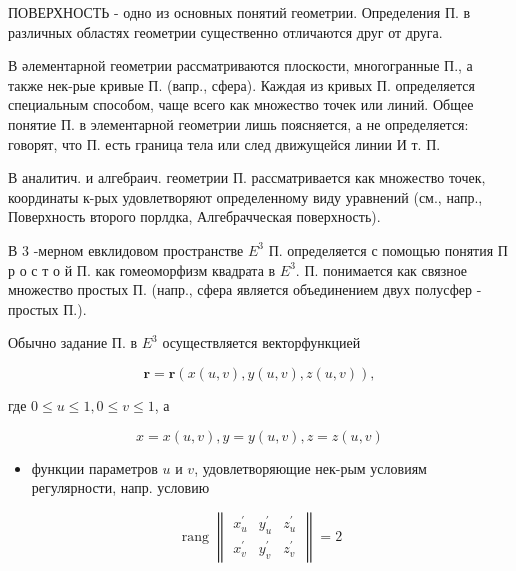 \documentclass[10pt]{article}
\begin{document}
ПОВЕРХНОСТЬ - одно из основных понятий геометрии. Определения П. в различных областях геометрии существенно отличаются друг от друга.



В әлементарной геометрии рассматриваются плоскости, многогранные П., а также нек-рые кривые П. (вапр., сфера). Каждая из кривых П. определяется специальным способом, чаще всего как множество точек или линий. Общее понятие П. в элементарной геометрии лишь поясняется, а не определяется: говорят, что П. есть граница тела или след движущейся линии И т. П.



В аналитич. и алгебраич. геометрии П. рассматривается как множество точек, координаты к-рых удовлетворяют определенному виду уравнений (см., напр., Поверхность второго порлдка, Алгебрачческая поверхность).



В 3 -мерном евклидовом пространстве $E^{3}$ П. определяется с помощью понятия П р о с т о й П. как гомеоморфизм квадрата в $E^{3}$. П. понимается как связное множество простых П. (напр., сфера является объединением двух полусфер - простых П.).



Обычно задание П. в $E^{3}$ осуществляется векторфункцией



\[

\boldsymbol{r}=\boldsymbol{r}(x(u, v), y(u, v), z(u, v)),

\]



где $0 \leqslant u \leqslant 1,0 \leqslant v \leqslant 1$, а



\[

x=x(u, v), y=y(u, v), z=z(u, v)

\]



\begin{itemize}

  \item функции параметров $u$ и $v$, удовлетворяющие нек-рым условиям регулярности, напр. условию

\end{itemize}



\[

\operatorname{rang}\left\|\begin{array}{ccc}

x_{u}^{\prime} & y_{u}^{\prime} & z_{u}^{\prime} \\

x_{v}^{\prime} & y_{v}^{\prime} & z_{v}^{\prime}

\end{array}\right\|=2

\]
\end{document}
